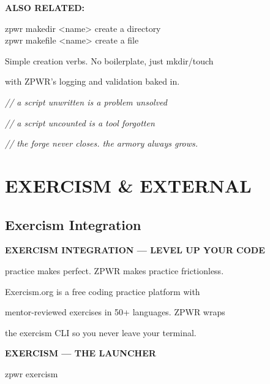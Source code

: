 \documentclass[11pt,a4paper,twoside]{book}
\begin{document}
\vspace{12pt}
{\bfseries\color{neonyellow} ALSO RELATED:}\vspace{4pt}

\begin{codebox}
zpwr makedir <name>     create a directory\\
zpwr makefile <name>    create a file\\
\end{codebox}

Simple creation verbs. No boilerplate, just mkdir/touch

with ZPWR's logging and validation baked in.

{\small\itshape\color{dimtext} // a script unwritten is a problem unsolved}

{\small\itshape\color{dimtext} // a script uncounted is a tool forgotten}

{\small\itshape\color{dimtext} // the forge never closes. the armory always grows.}


\vspace{16pt}


\chapter{EXERCISM \& EXTERNAL}

\section{Exercism Integration}


\vspace{10pt}
{\large\bfseries\color{neoncyan} EXERCISM INTEGRATION — LEVEL UP YOUR CODE}\vspace{6pt}

practice makes perfect. ZPWR makes practice frictionless.

\begin{codebox}
Exercism.org is a free coding practice platform with\\
\end{codebox}

mentor-reviewed exercises in 50+ languages. ZPWR wraps

the exercism CLI so you never leave your terminal.


\vspace{12pt}
{\bfseries\color{neonyellow} EXERCISM — THE LAUNCHER}\vspace{4pt}

\begin{codebox}
zpwr exercism\\
\end{codebox}
\end{document}
